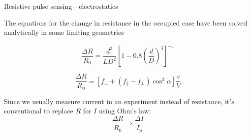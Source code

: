 
\begin{frame}[c]{Resistive pulse sensing---electrostatics}


		The equations for the change in resistance in the occupied case have been solved analytically in some limiting geometries \\
		
		\vspace{.1in}
		
		
		\begin{equation} \tag{On-axis sphere through cylinder}
			\frac{\Delta R}{R_{0}}=\frac{d^{3}}{LD^{2}}\left[1-0.8\left(\frac{d}{D}\right)^{3}\right]^{-1}
		\end{equation}
		
		\vspace{.1in}
		
		
		\begin{equation} \tag{On-axis ellipsoid of revolution}
			\frac{\Delta R}{R_{0}}=\left[f_{\perp}+\left(f_{\parallel}-f_{\perp}\right)\cos^{2}\alpha\right]\frac{v}{V}
		\end{equation}
		
		\vspace{0.1in}
		
		
		Since we usually measure current in an experiment instead of resistance, it's conventional to replace $R$ for $I$ using Ohm's law:
		\[ \frac{\Delta R}{R_{0}}\Rightarrow\frac{\Delta I}{I_{p}} \]
\end{frame}







